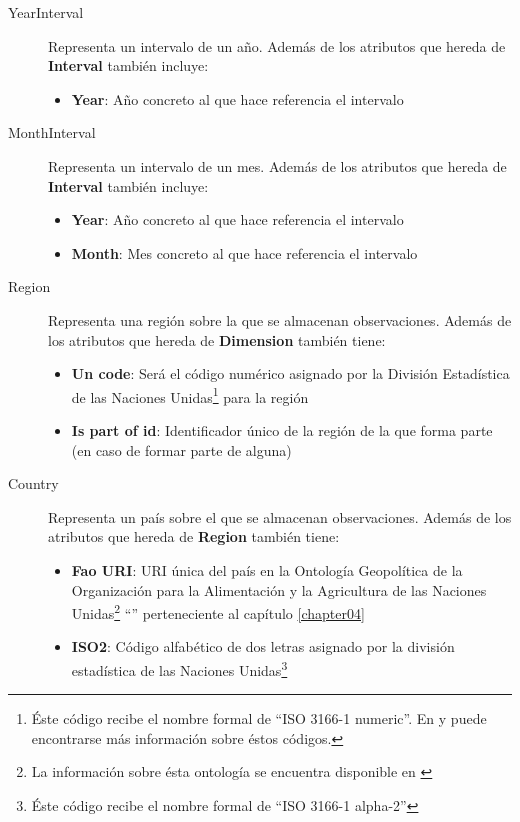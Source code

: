\begin{description}
\begin{itemize}
	\end{itemize}
	\item[YearInterval]  Representa un intervalo de un año.  Además de los atributos que hereda de \textbf{Interval} también incluye:
	\begin{itemize}
		\item \textbf{Year}:  Año concreto al que hace referencia el intervalo
	\end{itemize}
	\item[MonthInterval]  Representa un intervalo de un mes.  Además de los atributos que hereda de \textbf{Interval} también incluye:
	\begin{itemize}
		\item \textbf{Year}:  Año concreto al que hace referencia el intervalo
		\item \textbf{Month}:  Mes concreto al que hace referencia el intervalo
	\end{itemize}
	\item[Region]  Representa una región sobre la que se almacenan observaciones.  Además de los atributos que hereda de \textbf{Dimension} también tiene:
	\begin{itemize}
		\item \textbf{Un code}:  Será el código numérico asignado por la División Estadística de las Naciones Unidas\footnote{Éste código recibe el nombre formal de ``ISO 3166-1 numeric''.  En \cite{un:standard-country-codes} y \cite{un:iso-3166-country-codes} puede encontrarse más información sobre éstos códigos.} para la región
		\item \textbf{Is part of id}:  Identificador único de la región de la que forma parte (en caso de formar parte de alguna)
	\end{itemize}
	\item[Country]  Representa un país sobre el que se almacenan observaciones.  Además de los atributos que hereda de \textbf{Region} también tiene:
	\begin{itemize}
		\item \textbf{Fao URI}:  URI única del país en la Ontología Geopolítica de la Organización para la Alimentación y la Agricultura de las Naciones Unidas\footnote{La información sobre ésta ontología se encuentra disponible en \cite{fao:geopolitical-ontology}} ``'' perteneciente al capítulo \ref{chapter04}
		\item \textbf{ISO2}:  Código alfabético de dos letras asignado por la división estadística de las Naciones Unidas\footnote{Éste código recibe el nombre formal de ``ISO 3166-1 alpha-2''}

\end{itemize}
\end{description}
